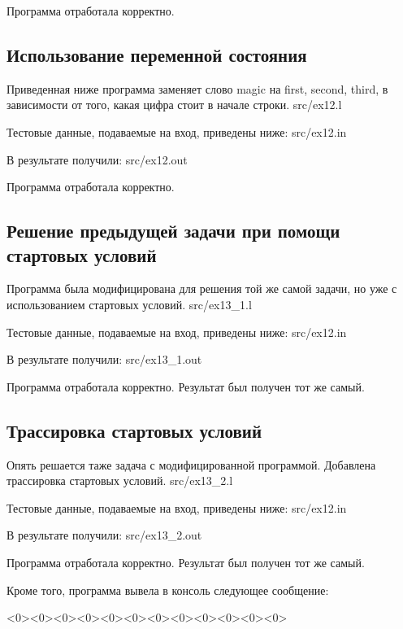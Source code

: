     Программа отработала корректно.

\subsection{Использование переменной состояния}

    Приведенная ниже программа заменяет слово magic на first, second, third,
    в зависимости от того, какая цифра стоит в начале строки.
     {src/ex12.l}

    Тестовые данные, подаваемые на вход, приведены ниже:
     {src/ex12.in}
    
    В результате получили:
     {src/ex12.out}

    Программа отработала корректно.

\subsection{Решение предыдущей задачи при помощи стартовых условий}

    Программа была модифицирована для решения той же самой задачи,
    но уже с использованием стартовых условий.
     {src/ex13_1.l}

    Тестовые данные, подаваемые на вход, приведены ниже:
     {src/ex12.in}
    
    В результате получили:
     {src/ex13_1.out}

    Программа отработала корректно. Результат был получен тот же самый.

\subsection{Трассировка стартовых условий}

    Опять решается таже задача с модифицированной программой. Добавлена трассировка стартовых условий.
     {src/ex13_2.l}

    Тестовые данные, подаваемые на вход, приведены ниже:
     {src/ex12.in}
    
    В результате получили:
     {src/ex13_2.out}

    Программа отработала корректно. Результат был получен тот же самый.
    
    Кроме того, программа вывела в консоль следующее сообщение:

    <0><0><0><0><0><0><0><0><0><0><0><0>

